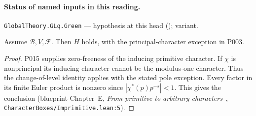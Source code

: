 

\paragraph{Status of named inputs in this reading.}
\noindent\nolinkurl{GlobalTheory.GLq.Green} --- hypothesis at this head (); variant.\par

\begin{theorem}\label{pn:P014}
Assume $\mathcal B,V,\mathcal F$. Then $H$ holds, with the principal-character exception in P003.
\end{theorem}
\begin{proof}
P015 supplies zero-freeness of the inducing primitive character. If $\chi$ is nonprincipal its inducing character cannot be the modulus-one character. Thus the change-of-level identity applies with the stated pole exception. Every factor in its finite Euler product is nonzero since $|\chi^*(p)p^{-s}|<1$. This gives the conclusion (blueprint Chapter~E, \emph{From primitive to arbitrary characters}~, \nolinkurl{CharacterBoxes/Imprimitive.lean:5}).
\end{proof}
